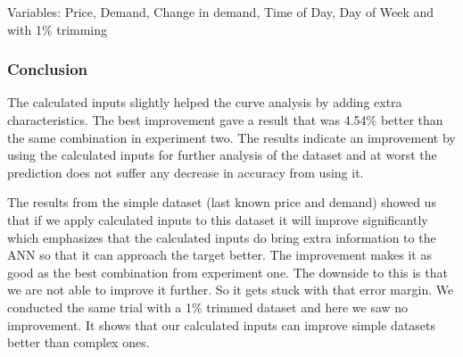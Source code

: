 \noindent Variables: Price, Demand, Change in demand, Time of Day, Day of Week and with 1\% trimming
\begin{table}[H]
\centering  %
\caption{Scatter text~\cite{singhal2011electricity} with other calculated inputs and 1\% trim} %
\label{table:scatter_text_1p_trim} %
\end{table}

\subsubsection{Conclusion}
The calculated inputs slightly helped the curve analysis by adding extra characteristics. The best improvement gave a result that was 4.54\% better than the same combination in experiment two. The results indicate an improvement by using the calculated inputs for further analysis of the dataset and at worst the prediction does not suffer any decrease in accuracy from using it.

The results from the simple dataset (last known price and demand) showed us that if we apply calculated inputs to this dataset it will improve significantly which emphasizes that the calculated inputs do bring extra information to the ANN so that it can approach the target better. The improvement makes it as good as the best combination from experiment one. The downside to this is that we are not able to improve it further. So it gets stuck with that error margin. We conducted the same trial with a 1\% trimmed dataset and here we saw no improvement. It shows that our calculated inputs can improve simple datasets better than complex ones.

